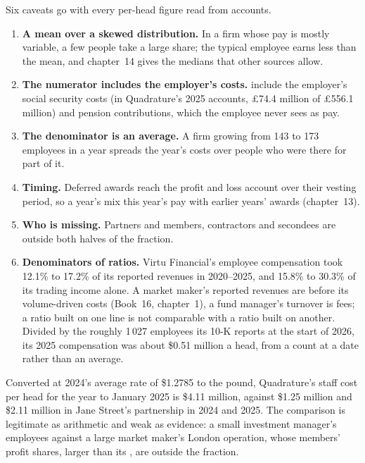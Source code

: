 Six caveats go with every per-head figure read from accounts.
\begin{enumerate}
\item \textbf{A mean over a skewed distribution.} In a firm whose pay is mostly variable, a few people take a large
share; the typical employee earns less than the mean, and chapter~14 gives the medians that other sources allow.
\item \textbf{The numerator includes the employer's costs.}  include the employer's social security costs
(in Quadrature's 2025 accounts, \pounds74.4 million of \pounds556.1 million) and pension contributions, which the
employee never sees as pay.
\item \textbf{The denominator is an average.} A firm growing from 143 to 173 employees in a year spreads the year's
costs over people who were there for part of it.
\item \textbf{Timing.} Deferred awards reach the profit and loss account over their vesting period, so a year's  mix this year's pay with earlier years' awards (chapter~13).
\item \textbf{Who is missing.} Partners and members, contractors and secondees are outside both halves of the fraction.
\item \textbf{Denominators of ratios.} Virtu Financial's employee compensation took 12.1\% to 17.2\% of its reported
revenues in 2020--2025, and 15.8\% to 30.3\% of its trading income alone. A market maker's reported revenues are
before its volume-driven costs (Book~16, chapter~1), a fund manager's turnover is fees; a ratio built on one line is not
comparable with a ratio built on another. Divided by the roughly 1\,027 employees its 10-K reports at the start of 2026,
its 2025 compensation was about \$0.51 million a head, from a count at a date rather than an average.
\end{enumerate}

Converted at 2024's average rate of \$1.2785 to the pound, Quadrature's staff cost per head for the year to January
2025 is \$4.11 million, against \$1.25 million and \$2.11 million in Jane Street's partnership in 2024 and 2025. The
comparison is legitimate as arithmetic and weak as evidence: a small investment manager's employees against a large
market maker's London operation, whose members' profit shares, larger than its , are outside the fraction.

